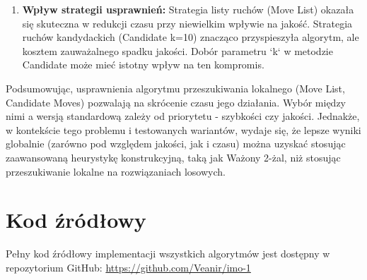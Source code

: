 \documentclass[12pt,a4paper]{article}
\begin{document}
\begin{enumerate}
    \item \textbf{Wpływ strategii usprawnień:} Strategia listy ruchów (Move List) okazała się skuteczna w redukcji czasu przy niewielkim wpływie na jakość. Strategia ruchów kandydackich (Candidate k=10) znacząco przyspieszyła algorytm, ale kosztem zauważalnego spadku jakości. Dobór parametru `k` w metodzie Candidate może mieć istotny wpływ na ten kompromis.

\end{enumerate}

Podsumowując, usprawnienia algorytmu przeszukiwania lokalnego (Move List, Candidate Moves) pozwalają na skrócenie czasu jego działania. Wybór między nimi a wersją standardową zależy od priorytetu - szybkości czy jakości. Jednakże, w kontekście tego problemu i testowanych wariantów, wydaje się, że lepsze wyniki globalnie (zarówno pod względem jakości, jak i czasu) można uzyskać stosując zaawansowaną heurystykę konstrukcyjną, taką jak Ważony 2-żal, niż stosując przeszukiwanie lokalne na rozwiązaniach losowych.

\section{Kod źródłowy}
Pełny kod źródłowy implementacji wszystkich algorytmów jest dostępny w repozytorium GitHub:
\url{https://github.com/Veanir/imo-1}
\end{document}
